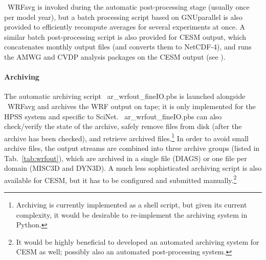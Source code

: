 \documentclass[letterpaper,12pt,headsepline,final]{scrartcl} %
\newcommand{\tab}[1]{Tab.~\ref{#1}}
\newcommand{\WRFavg}{\mbox{\color{blue} \sffamily WRFavg}}
\newcommand{\archive}{\mbox{\color{brown} \ttfamily ar\_wrfout\_fineIO.pbs}}
\begin{document}
\WRFavg{} is invoked during the automatic post-processing stage (usually once per model year), but a batch processing script based on \textsf{GNUparallel} \citep{gnuparallel} is also provided to efficiently recompute averages for several experiments at once.
A similar batch post-processing script is also provided for CESM output, which concatenates monthly output files (and converts them to NetCDF-4), and runs the AMWG and CVDP analysis packages on the CESM output (see \citealp[][\S2.1.5]{erler2015phd}).

\paragraph{Archiving} The automatic archiving script \archive{} is launched alongside \WRFavg{} and archives the WRF output on tape; it is only implemented for the HPSS system and specific to SciNet. \archive{} can also check/verify the state of the archive, safely remove files from disk (after the archive has been checked), and retrieve archived files.\footnote{Archiving is currently implemented as a shell script, but given its current complexity, it would be desirable to re-implement the archiving system in Python.}
In order to avoid small archive files, the output streams are combined into three archive groups (listed in \tab{tab:wrfout}), which are archived in a single file (\textsf{DIAGS}) or one file per domain (\textsf{MISC3D} and \textsf{DYN3D}).
A much less sophisticated archiving script is also available for CESM, but it has to be configured and submitted manually.\footnote{It would be highly beneficial to developed an automated archiving system for CESM as well; possibly also an automated post-processing system.}
\end{document}
